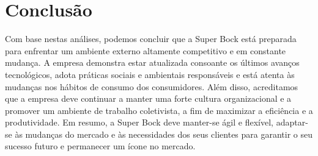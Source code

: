 \chapter{Conclusão}
\label{conclusion} %
Com base nestas análises, podemos concluir que a Super Bock está preparada para enfrentar um ambiente externo altamente competitivo e em constante mudança. 
A empresa demonstra estar atualizada consoante os últimos avanços tecnológicos, adota práticas sociais e ambientais responsáveis e está atenta às mudanças nos hábitos de consumo dos consumidores. 
Além disso, acreditamos que a empresa deve continuar a manter uma forte cultura organizacional e a promover um ambiente de trabalho coletivista, a fim de maximizar a eficiência e a produtividade. Em resumo, a Super Bock deve manter-se ágil e flexível, adaptar-se às mudanças do mercado e às necessidades dos seus clientes para garantir o seu sucesso futuro e permanecer um ícone no mercado.